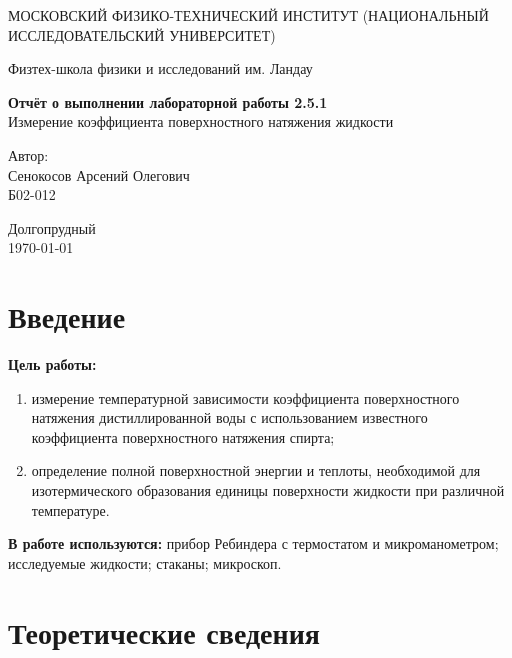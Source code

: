 \documentclass[a4paper,12pt]{article} %
\date{\today}
\begin{document}
\begin{titlepage}
	\begin{center}
		{\large МОСКОВСКИЙ ФИЗИКО-ТЕХНИЧЕСКИЙ ИНСТИТУТ (НАЦИОНАЛЬНЫЙ ИССЛЕДОВАТЕЛЬСКИЙ УНИВЕРСИТЕТ)}
	\end{center}
	\begin{center}
		{\large Физтех-школа физики и исследований им. Ландау}
	\end{center}
	
	
	\vspace{4.5cm}
	{\huge
		\begin{center}
			{\bf Отчёт о выполнении лабораторной работы 2.5.1}\\
			Измерение коэффициента поверхностного натяжения жидкости
		\end{center}
	}
	\vspace{2cm}
	\begin{flushright}
		{\LARGE Автор:\\ Сенокосов Арсений Олегович \\
			\vspace{0.2cm}
			Б02-012}
	\end{flushright}
	\vspace{8cm}
	\begin{center}
		Долгопрудный\\
		\today
	\end{center}
\end{titlepage}


\section{Введение}
\textbf{Цель работы:}  \begin{enumerate}
	\item измерение температурной зависимости  коэффициента поверхностного натяжения дистиллированной воды с использованием известного коэффициента поверхностного натяжения спирта;
	\item определение полной поверхностной энергии  и теплоты, необходимой для изотермического образования единицы  поверхности жидкости  при различной температуре.
\end{enumerate}

\textbf{В работе используются:} прибор  Ребиндера  с термостатом и микроманометром; исследуемые жидкости; стаканы; микроскоп.
\section{Теоретические сведения}
\end{document}

